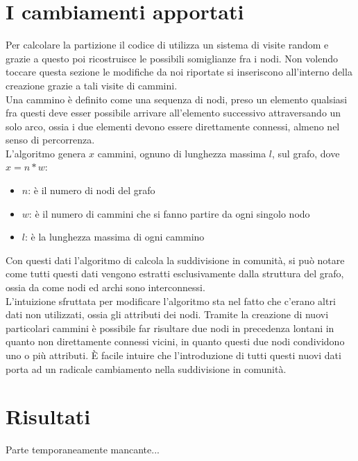 \section{I cambiamenti apportati}
Per calcolare la partizione il codice di \cnrl utilizza un sistema di visite random e grazie a questo poi ricostruisce le possibili somiglianze fra i nodi. Non volendo toccare questa sezione le modifiche da noi riportate si inseriscono all'interno della creazione grazie a tali visite di cammini.\\
Una cammino è definito come una sequenza di nodi, preso un elemento qualsiasi fra questi deve esser possibile arrivare all'elemento successivo attraversando un solo arco, ossia i due elementi devono essere direttamente connessi, almeno nel senso di percorrenza.\\
L'algoritmo genera $x$ cammini, ognuno di lunghezza massima $l$, sul grafo, dove $x=n*w$:
\begin{itemize}
	\item $n$: è il numero di nodi del grafo
	\item $w$: è il numero di cammini che si fanno partire da ogni singolo nodo
	\item $l$: è la lunghezza massima di ogni cammino
\end{itemize}
%
Con questi dati l'algoritmo di \cnrl calcola la suddivisione in comunità, si può notare come tutti questi dati vengono estratti esclusivamente dalla struttura del grafo, ossia da come nodi ed archi sono interconnessi.\\
L'intuizione sfruttata per modificare l'algoritmo sta nel fatto che c'erano altri dati non utilizzati, ossia gli attributi dei nodi. Tramite la creazione di nuovi particolari cammini è possibile far risultare due nodi in precedenza lontani in quanto non direttamente connessi vicini, in quanto questi due nodi condividono uno o più attributi. È facile intuire che l'introduzione di tutti questi nuovi dati porta ad un radicale cambiamento nella suddivisione in comunità.
%
\section{Risultati}
Parte temporaneamente mancante...

%
%
%
%
\newpage
%

